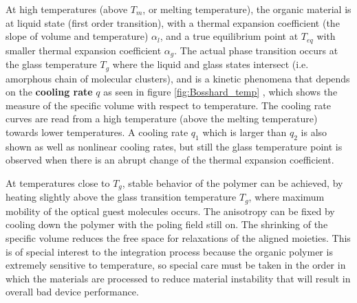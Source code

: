 At high temperatures (above $T_m$, or melting temperature), the organic material is at liquid state (first order transition), with a thermal expansion coefficient (the slope of volume and temperature) $\alpha_l$, and a true equilibrium point at $T_{eq}$ with smaller thermal expansion coefficient $\alpha_g$. The actual phase transition occurs at the glass temperature $T_g$ where the liquid and glass states intersect (i.e. amorphous chain of molecular clusters), and is a kinetic phenomena that depends on the \textbf{cooling rate} $q$ as seen in figure \ref{fig:Bosshard_temp} \cite{BosshardOrgaNLO95}, which shows the measure of the specific volume with respect to temperature. The cooling rate curves are read from a high temperature (above the melting temperature) towards lower temperatures. A cooling rate $q_1$ which is larger than $q_2$ is also shown as well as nonlinear cooling rates, but still the glass temperature point is observed when there is an abrupt change of the thermal expansion coefficient. 




At temperatures close to $T_g$, stable behavior of the polymer can be achieved, by heating slightly above the glass transition temperature $T_g$, where maximum mobility of the optical guest molecules occurs. The anisotropy can be fixed by cooling down the polymer with the poling field still on. The shrinking of the specific volume reduces the free space for relaxations of the aligned moieties. This is of special interest to the integration process because the organic polymer is extremely sensitive to temperature, so special care must be taken in the order in which the materials are processed to reduce material instability that will result in overall bad device performance.



